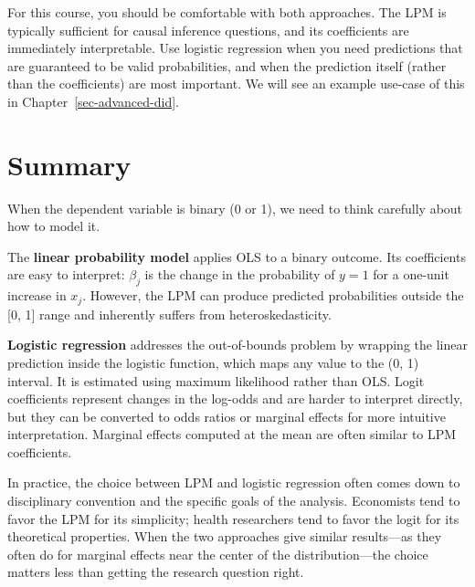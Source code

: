 \documentclass[
  letterpaper,
  DIV=11,
  numbers=noendperiod]{scrreprt}
\begin{document}
\begin{tcolorbox}[enhanced jigsaw, arc=.35mm, bottomrule=.15mm, bottomtitle=1mm, breakable, colback=white, colbacktitle=quarto-callout-tip-color!10!white, colframe=quarto-callout-tip-color-frame, coltitle=black, left=2mm, leftrule=.75mm, opacityback=0, opacitybacktitle=0.6, rightrule=.15mm, title=\textcolor{quarto-callout-tip-color}{\faLightbulb}\hspace{0.5em}{Practical Advice}, titlerule=0mm, toprule=.15mm, toptitle=1mm]

For this course, you should be comfortable with both approaches. The LPM
is typically sufficient for causal inference questions, and its
coefficients are immediately interpretable. Use logistic regression when
you need predictions that are guaranteed to be valid probabilities, and
when the prediction itself (rather than the coefficients) are most
important. We will see an example use-case of this in
Chapter~\ref{sec-advanced-did}.

\end{tcolorbox}

\section{Summary}\label{summary-5}

When the dependent variable is binary (0 or 1), we need to think
carefully about how to model it.

The \textbf{linear probability model} applies OLS to a binary outcome.
Its coefficients are easy to interpret: \(\beta_j\) is the change in the
probability of \(y = 1\) for a one-unit increase in \(x_j\). However,
the LPM can produce predicted probabilities outside the {[}0, 1{]} range
and inherently suffers from heteroskedasticity.

\textbf{Logistic regression} addresses the out-of-bounds problem by
wrapping the linear prediction inside the logistic function, which maps
any value to the (0, 1) interval. It is estimated using maximum
likelihood rather than OLS. Logit coefficients represent changes in the
log-odds and are harder to interpret directly, but they can be converted
to odds ratios or marginal effects for more intuitive interpretation.
Marginal effects computed at the mean are often similar to LPM
coefficients.

In practice, the choice between LPM and logistic regression often comes
down to disciplinary convention and the specific goals of the analysis.
Economists tend to favor the LPM for its simplicity; health researchers
tend to favor the logit for its theoretical properties. When the two
approaches give similar results---as they often do for marginal effects
near the center of the distribution---the choice matters less than
getting the research question right.
\end{document}
